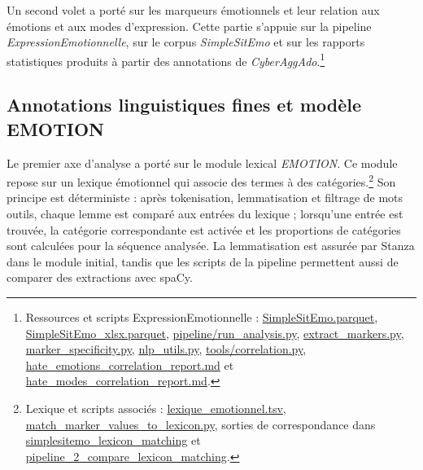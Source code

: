 Un second volet a porté sur les marqueurs émotionnels et leur relation aux émotions et aux modes d'expression. Cette partie s'appuie sur la pipeline \textit{ExpressionEmotionnelle}, sur le corpus \textit{SimpleSitEmo} et sur les rapports statistiques produits à partir des annotations de \textit{CyberAggAdo}.\footnote{Ressources et scripts ExpressionEmotionnelle : \href{https://github.com/GwenTsang/ExpressionEmotionnelle/blob/main/data/SimpleSitEmo.parquet}{SimpleSitEmo.parquet}, \href{https://github.com/GwenTsang/ExpressionEmotionnelle/blob/main/data/SimpleSitEmo_xlsx.parquet}{SimpleSitEmo\_xlsx.parquet}, \href{https://github.com/GwenTsang/ExpressionEmotionnelle/blob/main/pipeline/run_analysis.py}{pipeline/run\_analysis.py}, \href{https://github.com/GwenTsang/ExpressionEmotionnelle/blob/main/pipeline/extract_markers.py}{extract\_markers.py}, \href{https://github.com/GwenTsang/ExpressionEmotionnelle/blob/main/pipeline/marker_specificity.py}{marker\_specificity.py}, \href{https://github.com/GwenTsang/ExpressionEmotionnelle/blob/main/pipeline/nlp_utils.py}{nlp\_utils.py}, \href{https://github.com/GwenTsang/ExpressionEmotionnelle/blob/main/tools/correlation.py}{tools/correlation.py}, \href{https://github.com/GwenTsang/ExpressionEmotionnelle/blob/main/results/hate_emotions_correlation_report.md}{hate\_emotions\_correlation\_report.md} et \href{https://github.com/GwenTsang/ExpressionEmotionnelle/blob/main/results/hate_modes_correlation_report.md}{hate\_modes\_correlation\_report.md}.}

\subsection{Annotations linguistiques fines et modèle EMOTION}

Le premier axe d'analyse a porté sur le module lexical \textit{EMOTION}. Ce module repose sur un lexique émotionnel qui associe des termes à des catégories.\footnote{Lexique et scripts associés : \href{https://github.com/GwenTsang/ExpressionEmotionnelle/blob/main/emotions/lexique_emotionnel.tsv}{lexique\_emotionnel.tsv}, \href{https://github.com/GwenTsang/ExpressionEmotionnelle/blob/main/tools/match_marker_values_to_lexicon.py}{match\_marker\_values\_to\_lexicon.py}, sorties de correspondance dans \href{https://github.com/GwenTsang/ExpressionEmotionnelle/tree/main/results/simplesitemo_lexicon_matching}{simplesitemo\_lexicon\_matching} et \href{https://github.com/GwenTsang/ExpressionEmotionnelle/tree/main/results/pipeline_2_compare_lexicon_matching}{pipeline\_2\_compare\_lexicon\_matching}.} Son principe est déterministe : après tokenisation, lemmatisation et filtrage de mots outils, chaque lemme est comparé aux entrées du lexique ; lorsqu'une entrée est trouvée, la catégorie correspondante est activée et les proportions de catégories sont calculées pour la séquence analysée. La lemmatisation est assurée par Stanza dans le module initial, tandis que les scripts de la pipeline permettent aussi de comparer des extractions avec spaCy.


